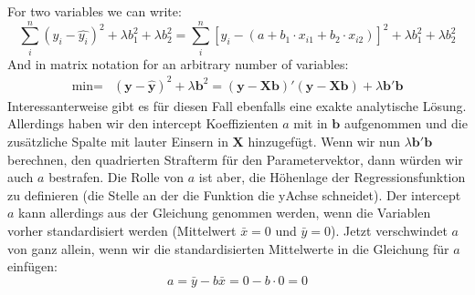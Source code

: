 \documentclass[letterpaper,10pt,english]{jupyterBook}
\begin{document}
\sphinxAtStartPar
For two variables we can write:
\begin{equation*}\sum_i^{n}(y_i - \hat{y_i})^2 + \lambda b_1^2 + \lambda b_2^2= \sum_i^{n}[y_i - (a + b_1\cdot x_{i1} + b_2\cdot x_{i2})]^{2}+ \lambda b_1^2 + \lambda b_2^2\end{equation*}
\sphinxAtStartPar
And in matrix notation for an arbitrary number of variables:
\begin{align*}
    \text{min}=&(\mathbf{y}-\hat{\mathbf{y}})^2 + \lambda \mathbf{b}^2=(\mathbf{y}-\mathbf{X}\mathbf{b})'(\mathbf{y}-\mathbf{X}\mathbf{b}) + \lambda \mathbf{b}'\mathbf{b}
\end{align*}
\sphinxAtStartPar
Interessanterweise gibt es für diesen Fall ebenfalls eine exakte analytische Lösung. 
Allerdings haben wir den intercept Koeffizienten \(a\) mit in \(\mathbf{b}\) aufgenommen und die zusätzliche Spalte mit lauter Einsern in \(\mathbf{X}\) hinzugefügt. Wenn wir nun \(\lambda \mathbf{b}'\mathbf{b}\) berechnen, den quadrierten Strafterm für den Parametervektor, dann würden wir auch \(a\) bestrafen. Die Rolle von \(a\) ist aber, die Höhenlage der Regressionsfunktion zu definieren (die Stelle an der die Funktion die y\sphinxhyphen{}Achse schneidet).
Der intercept \(a\) kann allerdings aus der Gleichung genommen werden, wenn die Variablen vorher standardisiert werden (Mittelwert \(\bar{x} = 0\) und \(\bar{y} = 0\)). Jetzt verschwindet \(a\) von ganz allein, wenn wir die standardisierten Mittelwerte in die Gleichung für \(a\) einfügen:
\begin{equation*}
a=\bar{y} - b\bar{x} = 0 - b\cdot 0 = 0
\end{equation*}
\end{document}
